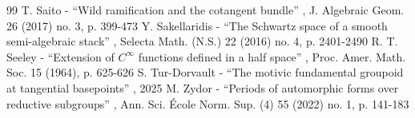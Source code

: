 \begin{thebibliography}{99}
 T. Saito - “Wild ramification and the cotangent bundle” , J. Algebraic Geom. 26 (2017) no. 3, p. 399-473
 Y. Sakellaridis - “The Schwartz space of a smooth semi-algebraic stack” , Selecta Math. (N.S.) 22 (2016) no. 4, p. 2401-2490
 R. T. Seeley - “Extension of $C^{\infty }$ functions defined in a half space” , Proc. Amer. Math. Soc. 15 (1964), p. 625-626
 S. Tur-Dorvault - “The motivic fundamental groupoid at tangential basepoints” , 2025
 M. Zydor - “Periods of automorphic forms over reductive subgroups” , Ann. Sci. École Norm. Sup. (4) 55 (2022) no. 1, p. 141-183
\end{thebibliography}
